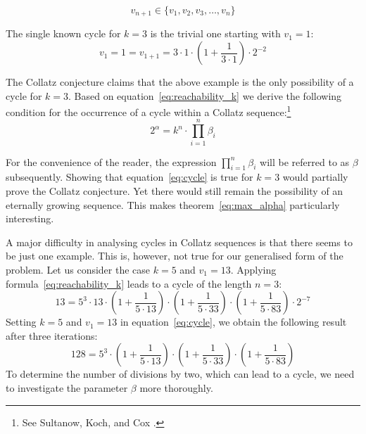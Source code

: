 \documentclass{SciPress_2015}
\begin{document}
\[
v_{n+1}\in\{v_1,v_2,v_3,\ldots,v_n\}
\]
\par\noindent
The single known cycle for $k=3$ is the trivial one starting with $v_1=1$:
\[
v_1=1=v_{1+1}=3\cdot1\cdot\left(1+\frac{1}{3\cdot1}\right)\cdot2^{-2}
\]

The Collatz conjecture claims that the above example is the only possibility of a cycle for $k=3$. Based on equation~\ref{eq:reachability_k} we derive the following condition for the occurrence of a cycle within a Collatz sequence:\footnote{See Sultanow, Koch, and Cox \cite[p.~11]{Ref_Sultanow_Koch_Cox_2020}.}
\begin{equation}
\label{eq:cycle}
    2^{\alpha}=k^n\cdot\prod_{i=1}^{n}\beta_i
\end{equation}

\par\medskip
For the convenience of the reader, the expression $\prod_{i=1}^{n}\beta_i$ will be referred to as $\beta$ subsequently. Showing that equation~\ref{eq:cycle} is true for $k=3$ would partially prove the Collatz conjecture. Yet there would still remain the possibility of an eternally growing sequence. This makes theorem~\ref{eq:max_alpha} particularly interesting.

\par\medskip
A major difficulty in analysing cycles in Collatz sequences is that there seems to be just one example. This is, however, not true for our generalised form of the problem. Let us consider the case $k=5$ and $v_1=13$. Applying formula~\ref{eq:reachability_k} leads to a cycle of the length $n=3$:
\[
13=5^3\cdot13\cdot\left(1+\frac{1}{5\cdot13}\right)\cdot\left(1+\frac{1}{5\cdot33}\right)\cdot\left(1+\frac{1}{5\cdot83}\right)\cdot2^{-7}
\]
Setting $k=5$ and $v_1=13$ in equation~\ref{eq:cycle}, we obtain the following result after three iterations:
\[
128=5^3\cdot\left(1+\frac{1}{5\cdot13}\right)\cdot\left(1+\frac{1}{5\cdot33}\right)\cdot\left(1+\frac{1}{5\cdot83}\right)
\]
To determine the number of divisions by two, which can lead to a cycle, we need to investigate the parameter $\beta$ more thoroughly.

\vspace{1em}\noindent
\end{document}

